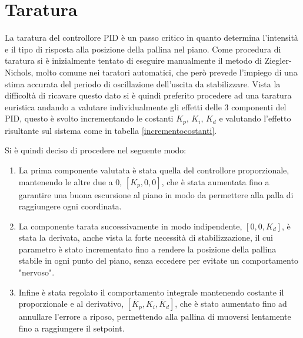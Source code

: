 \documentclass[12pt,twoside,openright]{report}
\begin{document}
\section{Taratura}\label{taratura}
La taratura del controllore PID è un passo critico in quanto determina l'intensità e il tipo di risposta alla posizione della pallina nel piano. Come procedura di taratura si è inizialmente tentato di eseguire manualmente il metodo di Ziegler-Nichols\cite{zieglernichols}\cite{PIDtuningball}, molto comune nei taratori automatici, che però prevede l'impiego di una stima accurata del periodo di oscillazione dell'uscita da stabilizzare. Vista la difficoltà di ricavare questo dato si è quindi preferito procedere ad una taratura euristica andando a valutare individualmente gli effetti delle 3 componenti del PID, questo è svolto incrementando le costanti $K_p$, $K_i$, $K_d$ e valutando l'effetto risultante sul sistema come in tabella \ref{incrementocostanti}.
\begin{table}[h!]
\centering
{}
\caption{Effetto dell'incremento delle costanti del controllore PID sui parametri di riferimento del sistema.}\label{incrementocostanti}
\end{table}
Si è quindi deciso di procedere nel seguente modo:
\begin{enumerate}
\item La prima componente valutata è stata quella del controllore proporzionale, mantenendo le altre due a $0$, $[K_p,0,0]$, che è stata aumentata fino a garantire una buona escursione al piano in modo da permettere alla palla di raggiungere ogni coordinata.
\item La componente tarata successivamente in modo indipendente, $[0,0,K_d]$, è stata la derivata, anche vista la forte necessità di stabilizzazione, il cui parametro è stato incrementato fino a rendere la posizione della pallina stabile in ogni punto del piano, senza eccedere per evitate un comportamento "nervoso".
\item Infine è stata regolato il comportamento integrale mantenendo costante il proporzionale e al derivativo, $[\overline{K}_p ,K_i, \overline{K}_d]$, che è stato aumentato fino ad annullare l'errore a riposo, permettendo alla pallina di muoversi lentamente fino a raggiungere il setpoint.
\end{enumerate}
\end{document}
